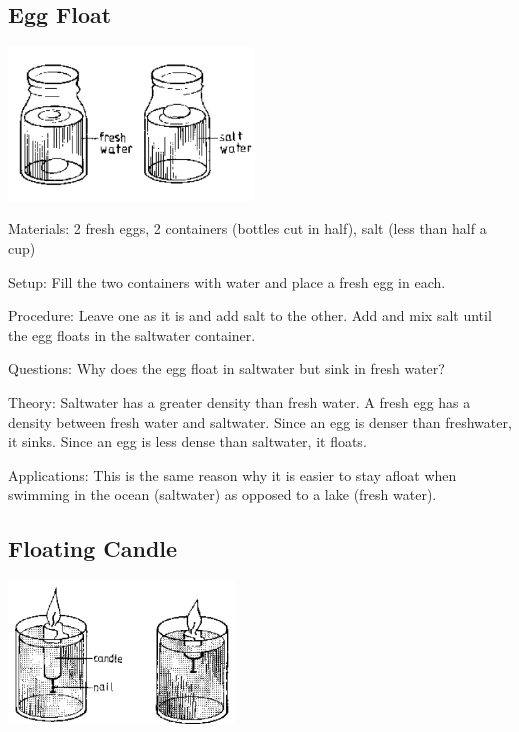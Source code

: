 \begin{multicols}{2}
\subsection{Egg Float}

\begin{center}
\includegraphics[width=0.49\textwidth]{./img/source/egg-float.png}
\end{center}

\begin{description*}
\item[Materials:]{2 fresh eggs, 2 containers (bottles cut in half), salt (less than half a cup)}
\item[Setup:]{Fill the two containers with water and place a fresh egg in each.}
\item[Procedure:]{Leave one as it is and add salt to the other. Add and mix salt until the egg floats in the saltwater container.}
\item[Questions:]{Why does the egg float in saltwater but sink in fresh water?}
\item[Theory:]{Saltwater has a greater density than fresh water. A fresh egg has a density between fresh water and saltwater. Since an egg is denser than freshwater, it sinks. Since an egg is less dense than saltwater, it floats.}
\item[Applications:]{This is the same reason why it is easier to stay afloat when swimming in the ocean (saltwater) as opposed to a lake (fresh water).}
\end{description*}

\subsection{Floating Candle}

\begin{center}
\includegraphics[width=0.45\textwidth]{./img/source/floating-candle.png}
\end{center}


\end{multicols}
